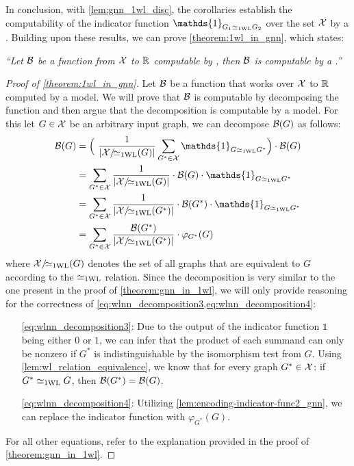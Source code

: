 In conclusion, with \cref{lem:gnn_1wl_disc}, the corollaries establish the computability of the indicator function $\mathds{1}_{G_1 \wliso G_2}$ over the set $\mathcal{X}$ by a \gnn. Building upon these results, we can prove \cref{theorem:1wl_in_gnn}, which states:
\begin{center}
    \noindent\textit{``Let $\mathcal{B}$ be a function from $\mathcal{X}$ to $\mathbb{R}$ computable by \wlnn, then $\mathcal{B}$ is computable by a \gnn.''}
\end{center}

\begin{proof}[Proof of \cref*{theorem:1wl_in_gnn}]
    Let $\mathcal{B}$ be a function that works over $\mathcal{X}$ to $\mathbb{R}$ computed by a \wlnn model. We will prove that $\mathcal{B}$ is \gnn computable by decomposing the function and then argue that the decomposition is computable by a \gnn model. For this let $G \in \mathcal{X}$ be an arbitrary input graph, we can decompose $\mathcal{B}(G)$ as follows:
    \begin{align}
        \cB(G) &= \Bigl( \ \frac{1}{|\cX/\!{\wliso}(G)|}\sum_{G^* \in \cX} \mathds{1}_{G \wliso G^*} \Bigr) \cdot \cB(G) \nonumber\\
        &= \sum_{G^* \in \cX} \frac{1}{|\cX/\!{\wliso}(G)|} \cdot \cB(G) \cdot \mathds{1}_{G \wliso G^*} \nonumber\\
        &= \sum_{G^* \in \cX} \frac{1}{|\cX/\!{\wliso}(G^*)|} \cdot \cB(G^*) \cdot \mathds{1}_{G \wliso G^*} \label{eq:wlnn_decomposition3}\\
        &= \sum_{G^* \in \cX} \frac{\cB(G^*)}{|\cX/\!{\wliso}(G^*)|}  \cdot \varphi_{G^*}(G) \label{eq:wlnn_decomposition4}
    \end{align}
    where $\mathcal{X}/\!{\simeq_{\text{1WL}}}(G)$ denotes the set of all graphs that are equivalent to $G$ according to the $\simeq_{\text{1WL}}$ relation. Since the decomposition is very similar to the one present in the proof of \cref{theorem:gnn_in_1wl}, we will only provide reasoning for the correctness of \cref{eq:wlnn_decomposition3,eq:wlnn_decomposition4}:
    \begin{itemize}[leftmargin=9em]
        \item[\cref*{eq:wlnn_decomposition3}:] Due to the output of the indicator function $\mathds{1}$ being either $0$ or $1$, we can infer that the product of each summand can only be nonzero if $G^*$ is indistinguishable by the \wl isomorphism test from $G$. Using \cref{lem:wl_relation_equivalence}, we know that for every graph $G^* \in \mathcal{X}$: if $G^* \simeq_{\text{1WL}} G$, then $\mathcal{B}(G^*) = \mathcal{B}(G)$.
        \item[\cref*{eq:wlnn_decomposition4}:] Utilizing \cref{lem:encoding-indicator-func2_gnn}, we can replace the indicator function with $\varphi_{G^*}(G)$.
    \end{itemize}
    For all other equations, refer to the explanation provided in the proof of \cref{theorem:gnn_in_1wl}.


\end{proof}
